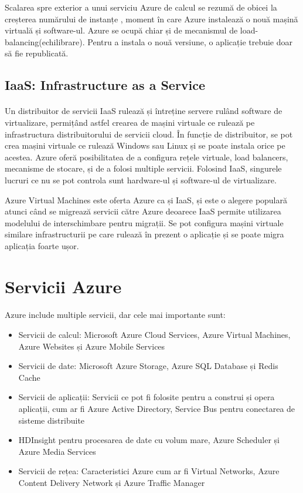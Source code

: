 Scalarea spre exterior a unui serviciu Azure de calcul se rezumă de obicei la creșterea numărului de instanțe , moment în care Azure instalează o nouă mașină virtuală și software-ul. Azure se ocupă chiar și de mecanismul de load-balancing(echilibrare). Pentru a instala o nouă versiune, o aplicație trebuie doar să fie republicată.\cite{20}

\subsection{IaaS: Infrastructure as a Service}
\vspace{1cm}
\paragraph{ }

Un distribuitor de servicii IaaS rulează și întreține servere rulând software de virtualizare, permițând astfel crearea de mașini virtuale ce rulează pe infrastructura distribuitorului de servicii cloud. În funcție de distribuitor, se pot crea mașini virtuale ce rulează Windows sau Linux și se poate instala orice pe acestea. Azure oferă posibilitatea de a configura rețele virtuale, load balancers, mecanisme de stocare, și de a folosi multiple servicii. Folosind IaaS, singurele lucruri ce nu se pot controla sunt hardware-ul și software-ul de virtualizare.

Azure Virtual Machines este oferta Azure ca și IaaS, și este o alegere populară atunci când se migrează servicii către Azure deoarece IaaS permite utilizarea modelului de interschimbare pentru migrații. Se pot configura mașini virtuale similare infrastructurii pe care rulează în prezent o aplicație și se poate migra aplicația foarte ușor.\cite{20}

\section{Servicii Azure}
\vspace{1cm}
\paragraph{} Azure include multiple servicii, dar cele mai importante sunt:\cite{20}

\begin{itemize}
\item Servicii de calcul: Microsoft Azure Cloud Services, Azure Virtual Machines, Azure Websites și Azure Mobile Services
\item Servicii de date: Microsoft Azure Storage, Azure SQL Database și Redis Cache
\item Servicii de aplicații: Servicii ce pot fi folosite pentru a construi și opera aplicații, cum ar fi Azure Active Directory, Service Bus pentru conectarea de sisteme distribuite
\item HDInsight pentru procesarea de date cu volum mare, Azure Scheduler și Azure Media Services
\item Servicii de rețea: Caracteristici Azure cum ar fi Virtual Networks, Azure Content Delivery Network și Azure Traffic Manager
\end{itemize}